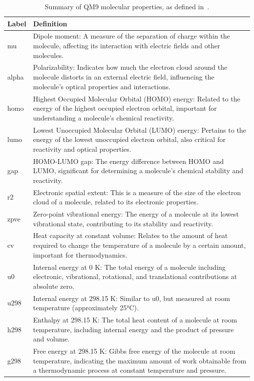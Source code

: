 \documentclass{article}
\begin{document}
\begin{table}
\tiny 
\caption{Summary of QM9 molecular properties, as defined in~\cite{Ruddigkeit2012EnumerationGDB-17,Ramakrishnan2015ElectronicSpace}.}
\begin{center}
    \begin{tabular}{ |p{2cm} | p{8cm} |}
    \hline
   \textbf{Label}   &  \textbf{Definition}   \\ \hline\hline
   mu   &   Dipole moment: A measure of the separation of charge within the molecule, affecting its interaction with electric fields and other molecules. \\ \hline
   alpha   &   Polarizability: Indicates how much the electron cloud around the molecule distorts in an external electric field, influencing the molecule's optical properties and interactions. \\ \hline
   homo   &   Highest Occupied Molecular Orbital (HOMO) energy: Related to the energy of the highest occupied electron orbital, important for understanding a molecule's chemical reactivity. \\ \hline
   lumo   &   Lowest Unoccupied Molecular Orbital (LUMO) energy: Pertains to the energy of the lowest unoccupied electron orbital, also critical for reactivity and optical properties. \\ \hline
   gap   &   HOMO-LUMO gap: The energy difference between HOMO and LUMO, significant for determining a molecule's chemical stability and reactivity. \\ \hline
   r2   &   Electronic spatial extent: This is a measure of the size of the electron cloud of a molecule, related to its electronic properties. \\ \hline
   zpve   &   Zero-point vibrational energy: The energy of a molecule at its lowest vibrational state, contributing to its stability and reactivity. \\ \hline
   cv   &   Heat capacity at constant volume: Relates to the amount of heat required to change the temperature of a molecule by a certain amount, important for thermodynamics. \\ \hline
   u0   &   Internal energy at 0 K: The total energy of a molecule including electronic, vibrational, rotational, and translational contributions at absolute zero. \\ \hline
   u298   &   Internal energy at 298.15 K: Similar to u0, but measured at room temperature (approximately 25°C). \\ \hline
   h298   &   Enthalpy at 298.15 K: The total heat content of a molecule at room temperature, including internal energy and the product of pressure and volume. \\ \hline
   g298   &   Free energy at 298.15 K: Gibbs free energy of the molecule at room temperature, indicating the maximum amount of work obtainable from a thermodynamic process at constant temperature and pressure. \\ \hline
    \end{tabular}
    \label{tab:table_QM9}
\end{center}
\end{table}
\end{document}
